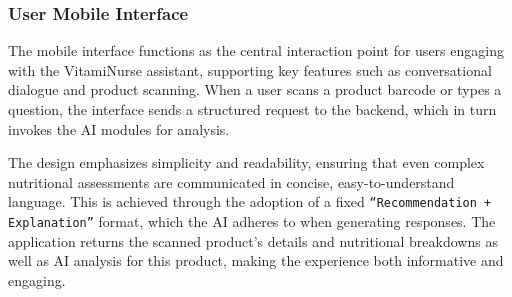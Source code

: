 \subsubsection{User Mobile Interface}
The mobile interface functions as the central interaction point for users engaging with the VitamiNurse assistant, supporting key features such as conversational dialogue and product scanning.
When a user scans a product barcode or types a question, the interface sends a structured request to the backend, which in turn invokes the AI modules for analysis. 
\par The design emphasizes simplicity and readability, ensuring that even complex nutritional assessments are communicated in concise, easy-to-understand language. This is achieved through the adoption of a fixed \texttt{“Recommendation + Explanation”} format, which the AI adheres to when generating responses. The application returns the scanned product's details and nutritional breakdowns as well as AI analysis for this product, making the experience both informative and engaging.
